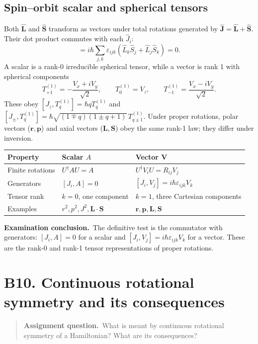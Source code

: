 \documentclass[11pt,a4paper]{article}
\theoremstyle{definition}
\newenvironment{question}{\begin{quote}\small\noindent\textbf{Assignment question.}\ }{\end{quote}}
\newcommand{\exam}[1]{\par\medskip\noindent\textbf{Examination conclusion.}\ #1\par}
\begin{document}
\subsection{Spin--orbit scalar and spherical tensors}
Both \(\hat{\mathbf L}\) and \(\hat{\mathbf S}\) transform as vectors under total rotations generated by \(\hat{\mathbf J}=\hat{\mathbf L}+\hat{\mathbf S}\). Their dot product commutes with each \(\hat J_i\):
\begin{equation}
[\hat J_i,\hat{\mathbf L}\cdot\hat{\mathbf S}]
=i\hbar\sum_{j,k}\varepsilon_{ijk}(\hat L_k\hat S_j+\hat L_j\hat S_k)=0.
\end{equation}
A scalar is a rank-0 irreducible spherical tensor, while a vector is rank 1 with spherical components
\begin{equation}
T^{(1)}_{+1}=-\frac{V_x+iV_y}{\sqrt2},\qquad
T^{(1)}_0=V_z,\qquad
T^{(1)}_{-1}=\frac{V_x-iV_y}{\sqrt2}.
\end{equation}
These obey \([J_z,T^{(1)}_q]=\hbar qT^{(1)}_q\) and \([J_\pm,T^{(1)}_q]=\hbar\sqrt{(1\mp q)(1\pm q+1)}\,T^{(1)}_{q\pm1}\). Under proper rotations, polar vectors (\(\mathbf r,\mathbf p\)) and axial vectors (\(\mathbf L,\mathbf S\)) obey the same rank-1 law; they differ under inversion.
\begin{center}\small
\begin{tabularx}{.96\textwidth}{@{}p{}XX@{}}\toprule
Property & Scalar \(A\) & Vector \(\mathbf V\) \\ \midrule
Finite rotations & \(U^\dagger AU=A\) & \(U^\dagger V_iU=R_{ij}V_j\)\\
Generators & \([J_i,A]=0\) & \([J_i,V_j]=i\hbar\varepsilon_{ijk}V_k\)\\
Tensor rank & \(k=0\), one component & \(k=1\), three Cartesian components\\
Examples & \(r^2,p^2,J^2,\mathbf L\cdot\mathbf S\) & \(\mathbf r,\mathbf p,\mathbf L,\mathbf S\)\\\bottomrule
\end{tabularx}
\end{center}
\exam{The definitive test is the commutator with generators: \([J_i,A]=0\) for a scalar and \([J_i,V_j]=i\hbar\varepsilon_{ijk}V_k\) for a vector. These are the rank-0 and rank-1 tensor representations of proper rotations.}

\section{B10. Continuous rotational symmetry and its consequences}
\begin{question}What is meant by continuous rotational symmetry of a Hamiltonian? What are its consequences?\end{question}
\end{document}
